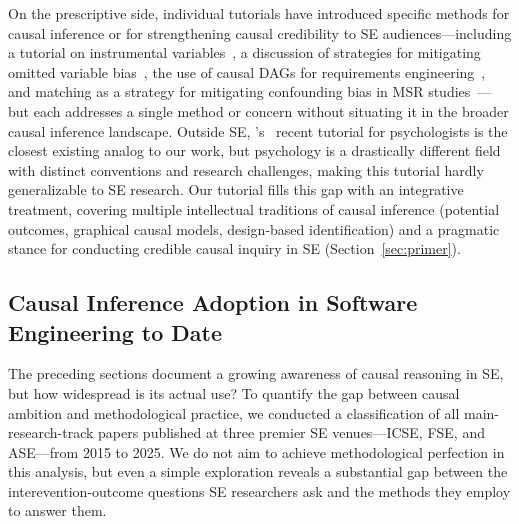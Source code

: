 On the prescriptive side, individual tutorials have introduced specific methods for causal inference or for strengthening causal credibility to SE audiences---including a tutorial on instrumental variables~\cite{DBLP:journals/tosem/GrafVlachyW24}, a discussion of strategies for mitigating omitted variable bias~\cite{DBLP:journals/corr/abs-2501-17026}, the use of causal DAGs for requirements engineering~\cite{DBLP:journals/corr/abs-2511-03875}, and matching as a strategy for mitigating confounding bias in MSR studies~\cite{DBLP:conf/msr/NoceraSLTV26}---but each addresses a single method or concern without situating it in the broader causal inference landscape.
Outside SE, \citeauthor{rohrer2024causal}'s~\cite{rohrer2024causal} recent tutorial for psychologists is the closest existing analog to our work, but psychology is a drastically different field with distinct conventions and research challenges, making this tutorial hardly generalizable to SE research.
Our tutorial fills this gap with an integrative treatment, covering multiple intellectual traditions of causal inference (potential outcomes, graphical causal models, design-based identification) and a pragmatic stance for conducting credible causal inquiry in SE (Section~\ref{sec:primer}).

\subsection{Causal Inference Adoption in Software Engineering to Date}
\label{sec:bg-adoption}


The preceding sections document a growing awareness of causal reasoning in SE, but how widespread is its actual use?
To quantify the gap between causal ambition and methodological practice, we conducted a classification of all main-research-track papers published at three premier SE venues---ICSE, FSE, and ASE---from 2015 to 2025.
We do not aim to achieve methodological perfection in this analysis, but even a simple exploration reveals a substantial gap between the interevention-outcome questions SE researchers ask and the methods they employ to answer them.

